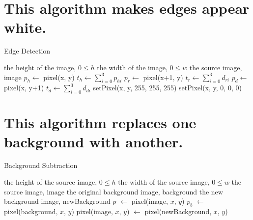 \documentclass{../../../fal_assignment}
\begin{document}
	\clearpage
	\section{This algorithm makes edges appear white.}
\begin{algorithm}[ht]
	\caption{Edge Detection}
	\label{alg:algorithm}
	
	\begin{algorithmic}[1]
		\Require
		\Statex the height of the image, $0 \leq h$
		\Statex the width of the image, $0 \leq w$
		\Statex the source image, image
		\State  $p_h \leftarrow$ pixel(x, y)
		\State $t_h \leftarrow \sum_{i=0}^{3}p_{hi} $
		\State  $p_r \leftarrow$ pixel(x+1, y)
		\State $t_r \leftarrow \sum_{i=0}^{3}d_{ri} $
		\State $p_d \leftarrow$ pixel(x, y+1)
		\State $t_d \leftarrow \sum_{i=0}^{3}d_{di} $
		\State
				\State setPixel(x, y,  255, 255, 255)
		\Else
				\State setPixel(x, y,  0, 0, 0)
		\EndIf
		\EndFor
		\EndFor
		\EndProcedure
	\end{algorithmic}
	
\end{algorithm}

	\clearpage
	\section{This algorithm replaces one background with another.}
\begin{algorithm}[ht]
	\caption{Background Subtraction}
	\label{alg:algorithm}
	
	\begin{algorithmic}[1]
		\Require
		\Statex the height of the source image, $0 \leq h$
		\Statex the width of the source image, $0 \leq w$
		\Statex the source image, image
		\Statex the original background image, background
		\Statex the new background image, newBackground
			\State $p$ $\leftarrow$ pixel(image, $x$, $y$)
			\State $p_{b}$ $\leftarrow$ pixel(background, $x$, $y$)
				\State pixel(image, $x$, $y$) $\leftarrow$ pixel(newBackground, $x$, $y$)
			\EndIf
		\EndFor
		\EndFor
		\EndProcedure
	\end{algorithmic}
	
\end{algorithm}

\clearpage
\end{document}
